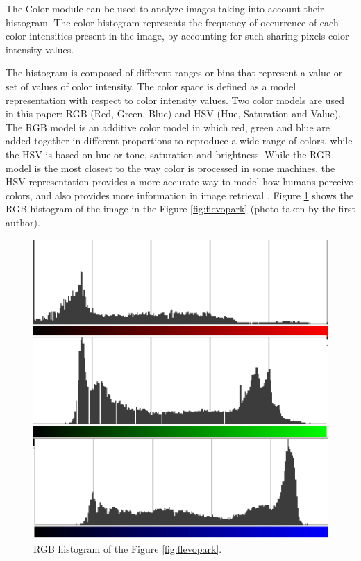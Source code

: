 \documentclass[conference]{IEEEtran}
\begin{document}
The Color module can be used to analyze images taking into account their histogram. The color histogram represents the frequency of occurrence of each color intensities present in the image, by accounting for such sharing pixels color intensity values.

The histogram is composed of different ranges or bins that represent a value or set of values of color intensity. The color space is defined as a model representation with respect to color intensity values. Two color models are used in this paper: RGB (Red, Green, Blue) and HSV (Hue, Saturation and Value). The RGB model is an additive color model in which red, green and blue are added together in different proportions to reproduce a wide range of colors, while the HSV is based on hue or tone, saturation and brightness. While the RGB model is the most closest to the way color is processed in some machines, the HSV representation provides a more accurate way to model how humans perceive colors, and also provides more information in image retrieval \cite{COLORDIFFERENCES}.
Figure \ref{fig:histogram} shows the RGB histogram of the image in the Figure \ref{fig:flevopark} (photo taken by the first author).

\begin{figure}
\centering
   \includegraphics[scale =0.6] {images/histogram.eps}
\caption{RGB histogram of the Figure \ref{fig:flevopark}. }
\label{fig:histogram}
\end{figure}
\end{document}
